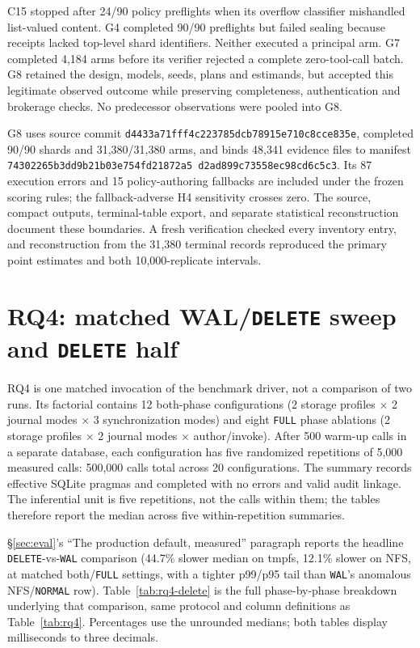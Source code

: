 \documentclass[conference,compsoc]{IEEEtran}
\newcommand{\GviiiManifestSHA}{\texttt{74302265\allowbreak b3dd9b21\allowbreak
68652630\allowbreak b03e754f\allowbreak d21872a5\allowbreak
d2ad899c\allowbreak 73558ec9\allowbreak 8cd6c5c3}}
\begin{document}
C15 stopped after 24/90 policy preflights when its overflow classifier mishandled list-valued content. G4 completed 90/90 preflights but failed sealing because receipts lacked top-level shard identifiers. Neither executed a principal arm. G7 completed 4{,}184 arms before its verifier rejected a complete zero-tool-call batch. G8 retained the design, models, seeds, plans and estimands, but accepted this legitimate observed outcome while preserving completeness, authentication and brokerage checks. No predecessor observations were pooled into G8.

G8 uses source commit \nolinkurl{d4433a71fff4c223785dcb78915e710c8cce835e}, completed 90/90 shards and 31{,}380/31{,}380 arms, and binds 48{,}341 evidence files to manifest \GviiiManifestSHA{}. Its 87 execution errors and 15 policy-authoring fallbacks are included under the frozen scoring rules; the fallback-adverse H4 sensitivity crosses zero. The source, compact outputs, terminal-table export, and separate statistical reconstruction document these boundaries. A fresh verification checked every inventory entry, and reconstruction from the 31{,}380 terminal records reproduced the primary point estimates and both 10{,}000-replicate intervals.

\section{RQ4: matched WAL/\texttt{DELETE} sweep and \texttt{DELETE} half}
\label{app:rq4-delete}
RQ4 is one matched invocation of the benchmark driver, not a comparison of two
runs. Its factorial contains 12 both-phase configurations
(2 storage profiles $\times$ 2 journal modes $\times$ 3 synchronization
modes) and eight \texttt{FULL} phase ablations (2 storage profiles $\times$
2 journal modes $\times$ author/invoke). After 500 warm-up calls in a separate
database, each configuration has five randomized repetitions of 5{,}000
measured calls: 500{,}000 calls total across 20 configurations. The summary
records effective SQLite pragmas and completed with
no errors and valid audit linkage. The inferential unit is five repetitions,
not the calls within them; the tables therefore report the median across five
within-repetition summaries.

\S\ref{sec:eval}'s ``The production default, measured'' paragraph reports
the headline \texttt{DELETE}-vs-\texttt{WAL} comparison (44.7\%
slower median on tmpfs, 12.1\% slower on NFS, at matched both/\texttt{FULL}
settings, with a tighter p99/p95 tail than \texttt{WAL}'s anomalous
NFS/\texttt{NORMAL} row). Table~\ref{tab:rq4-delete} is the full
phase-by-phase breakdown underlying that comparison, same protocol and
column definitions as Table~\ref{tab:rq4}. Percentages use the unrounded
medians; both tables display milliseconds to three decimals.
\end{document}
